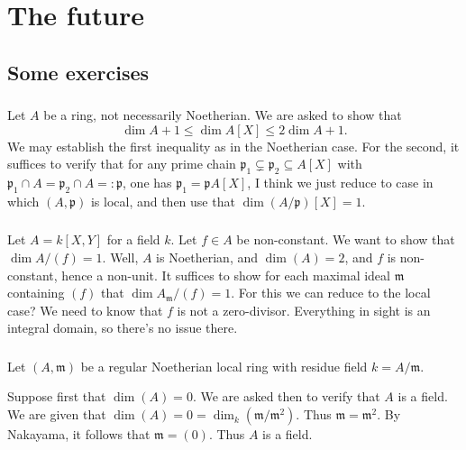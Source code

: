 \documentclass[10pt]{article}
\begin{document}
\section{The future}
\label{sec:org75bf553}

\subsection{Some exercises}
\label{sec:orge6fe150}

\subsubsection{}
\label{sec:org29f0766}

Let \(A\) be a ring, not necessarily Noetherian.
We are asked to show that
\[
    \dim A + 1 \leq \dim A[X] \leq 2 \dim A + 1.
  \]
We may establish the first inequality
as in the Noetherian case.
For the second,
it suffices to verify that
for any prime chain
\(\mathfrak{p}_1 \subsetneq \mathfrak{p}_2 \subseteq A[X]\)
with \(\mathfrak{p}_1 \cap A = \mathfrak{p}_2 \cap A =:
  \mathfrak{p}\),
one has \(\mathfrak{p}_1 = \mathfrak{p} A[X]\),
I think we just reduce to case in which \((A,\mathfrak{p})\)
is local,
and then use that \(\dim (A/\mathfrak{p})[X] = 1\).


\subsubsection{}
\label{sec:org0e0b82b}

Let \(A = k[X,Y]\)
for a field \(k\).
Let \(f \in A\) be non-constant.
We want to show that \(\dim A/(f) = 1\).
Well, \(A\) is Noetherian,
and \(\dim(A) = 2\),
and \(f\) is non-constant,
hence a non-unit.
It suffices to show for each maximal ideal \(\mathfrak{m}\)
containing \((f)\)
that \(\dim A_\mathfrak{m}/(f) = 1\).
For this we can reduce to the local case?
We need to know that \(f\) is not a zero-divisor.
Everything in sight is an integral domain,
so there's no issue there.


\subsubsection{}
\label{sec:org6c497dd}

Let \((A,\mathfrak{m})\) be a regular Noetherian local ring with residue field \(k = A/\mathfrak{m}\).

Suppose first that \(\dim(A) = 0\).  We are asked then to verify
that \(A\) is a field.  We are given that
\(\dim(A) = 0 = \dim_k(\mathfrak{m}/\mathfrak{m}^2)\).
Thus \(\mathfrak{m} = \mathfrak{m}^2\).
By Nakayama, it follows that \(\mathfrak{m} = (0)\).
Thus \(A\) is a field.
\end{document}
